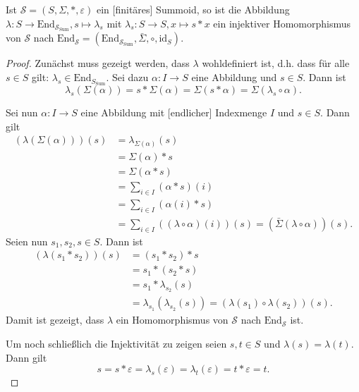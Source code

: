 \documentclass{article}
\begin{document}
\begin{theorem}
  Ist $\mathcal{S} = (S, \Sigma, \ast, \varepsilon)$ ein [finitäres] Summoid, 
  so ist die Abbildung $\lambda \colon S \to \text{End}_{\mathcal{S}_\text{Sum}}, s \mapsto \lambda_s$ mit
  $\lambda_s \colon S \to S, x \mapsto s \ast x$ ein injektiver Homomorphismus von $\mathcal{S}$ nach 
  $\text{End}_\mathcal{S} = (\text{End}_{\mathcal{S}_\text{Sum}}, \bar\Sigma, \circ, \text{id}_S)$.
\end{theorem}
\begin{proof}
  Zunächst muss gezeigt werden, dass $\lambda$ wohldefiniert ist, 
  d.h. dass für alle $s \in S$ gilt: $\lambda_s \in \text{End}_{S_\text{Sum}}$.
  Sei dazu $\alpha \colon I \to S$ eine Abbildung und $s \in S$. Dann ist 
  \begin{equation*}
    \lambda_s(\Sigma(\alpha)) = s \ast \Sigma(\alpha) = \Sigma(s \ast \alpha) = \Sigma(\lambda_s \circ \alpha).
  \end{equation*}

  Sei nun $\alpha \colon I \to S$ eine Abbildung mit [endlicher] Indexmenge $I$ und $s \in S$.
  Dann gilt 
  \begin{align*}
    (\lambda(\Sigma(\alpha)))(s)
    &= \lambda_{\Sigma(\alpha)}(s) \\
    &= \Sigma(\alpha) \ast s \\
    &= \Sigma(\alpha \ast s) \\
    &= \sum_{i \in I}(\alpha \ast s)(i) \\
    &= \sum_{i \in I}(\alpha(i) \ast s) \\
    &= \sum_{i \in I}((\lambda \circ \alpha)(i))(s)
    = (\bar\Sigma(\lambda \circ \alpha))(s).
  \end{align*}
  Seien nun $s_1, s_2, s \in S$.
  Dann ist
  \begin{align*}
    (\lambda(s_1 \ast s_2))(s)
    &= (s_1 \ast s_2) \ast s \\
    &= s_1 \ast (s_2 \ast s) \\
    &= s_1 \ast \lambda_{s_2}(s) \\
    &= \lambda_{s_1}(\lambda_{s_2}(s))
    = (\lambda(s_1) \circ \lambda(s_2))(s).
  \end{align*}
  Damit ist gezeigt, dass $\lambda$ ein Homomorphismus von $\mathcal{S}$ nach $\text{End}_\mathcal{S}$ ist.

  Um noch schließlich die Injektivität zu zeigen seien $s, t \in S$ und $\lambda(s) = \lambda(t)$.
  Dann gilt
  \begin{equation*}
    s = s \ast \varepsilon = \lambda_s(\varepsilon) = \lambda_t(\varepsilon) = t \ast \varepsilon = t. 
  \end{equation*}
\end{proof}
\end{document}
